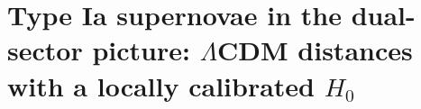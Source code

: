 
\chapter{Type Ia supernovae in the dual-sector picture: $\Lambda$CDM distances with a locally calibrated $H_0$}\label{ch:dsvalidation}

